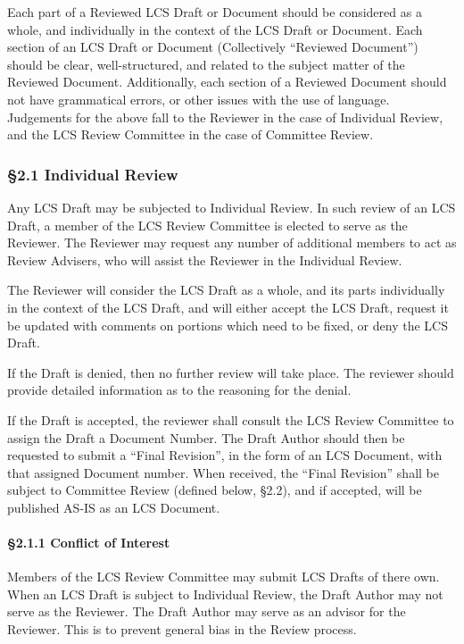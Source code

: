 Each part of a Reviewed LCS Draft or Document should be considered as a
whole, and individually in the context of the LCS Draft or Document.
Each section of an LCS Draft or Document (Collectively ``Reviewed
Document'') should be clear, well-structured, and related to the subject
matter of the Reviewed Document. Additionally, each section of a
Reviewed Document should not have grammatical errors, or other issues
with the use of language. Judgements for the above fall to the Reviewer
in the case of Individual Review, and the LCS Review Committee in the
case of Committee Review.

\hypertarget{individual-review}{%
\subsubsection{§2.1 Individual Review}\label{individual-review}}

Any LCS Draft may be subjected to Individual Review. In such review of
an LCS Draft, a member of the LCS Review Committee is elected to serve
as the Reviewer. The Reviewer may request any number of additional
members to act as Review Advisers, who will assist the Reviewer in the
Individual Review.

The Reviewer will consider the LCS Draft as a whole, and its parts
individually in the context of the LCS Draft, and will either accept the
LCS Draft, request it be updated with comments on portions which need to
be fixed, or deny the LCS Draft.

If the Draft is denied, then no further review will take place. The
reviewer should provide detailed information as to the reasoning for the
denial.

If the Draft is accepted, the reviewer shall consult the LCS Review
Committee to assign the Draft a Document Number. The Draft Author should
then be requested to submit a ``Final Revision'', in the form of an LCS
Document, with that assigned Document number. When received, the ``Final
Revision'' shall be subject to Committee Review (defined below, §2.2),
and if accepted, will be published AS-IS as an LCS Document.

\hypertarget{conflict-of-interest}{%
\paragraph{§2.1.1 Conflict of Interest}\label{conflict-of-interest}}

Members of the LCS Review Committee may submit LCS Drafts of there own.
When an LCS Draft is subject to Individual Review, the Draft Author may
not serve as the Reviewer. The Draft Author may serve as an advisor for
the Reviewer. This is to prevent general bias in the Review process.

